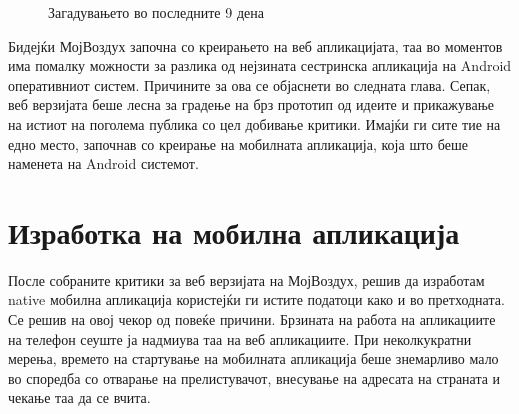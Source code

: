 \documentclass{uvamscse}
\begin{document}
\begin{figure}[H]
\centering
  \caption{Загадувањето во последните 9 дена}
  \label{fig:graf}
\end{figure}

Бидејќи МојВоздух започна со креирањето на веб апликацијата, таа во моментов има помалку можности за разлика од нејзината сестринска апликација на Android оперативниот систем. Причините за ова се објаснети во следната глава. Сепак, веб верзијата беше лесна за градење на брз прототип од идеите и прикажување на истиот на поголема публика со цел добивање критики. Имајќи ги сите тие на едно место, започнав со креирање на мобилната апликација, која што беше наменета на Android системот.

\chapter{Изработка на мобилна апликација}
После собраните критики за веб верзијата на МојВоздух, решив да изработам native мобилна апликација користејќи ги истите податоци како и во претходната. Се решив на овој чекор од повеќе причини. Брзината на работа на апликациите на телефон сеуште ја надмиува таа на веб апликациите. При неколкукратни мерења, времето на стартување на мобилната апликација беше знемарливо мало во споредба со отварање на прелистувачот, внесување на адресата на страната и чекање таа да се вчита.
\end{document}
